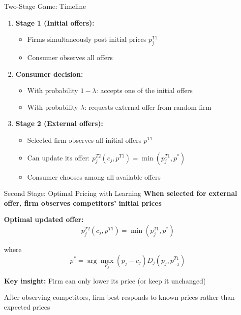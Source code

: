 \documentclass[10pt,aspectratio=169]{beamer}
\begin{document}

\begin{frame}{Two-Stage Game: Timeline}
\begin{enumerate}
    \item \textbf{Stage 1 (Initial offers):}
    \begin{itemize}
        \item Firms simultaneously post initial prices $p^{T1}_j$
        \item Consumer observes all offers
    \end{itemize}
    
    \vspace{0.3cm}
    
    \item \textbf{Consumer decision:}
    \begin{itemize}
        \item With probability $1-\lambda$: accepts one of the initial offers
        \item With probability $\lambda$: requests external offer from random firm
    \end{itemize}
    
    \vspace{0.3cm}
    
    \item \textbf{Stage 2 (External offers):}
    \begin{itemize}
        \item Selected firm observes all initial offers $p^{T1}$
        \item Can update its offer: $p^{T2}_j(c_j, p^{T1}) = \min(p^{T1}_j, p^*)$
        \item Consumer chooses among all available offers
    \end{itemize}
\end{enumerate}
\end{frame}


\begin{frame}{Second Stage: Optimal Pricing with Learning}
\textbf{When selected for external offer, firm observes competitors' initial prices}

\vspace{0.3cm}

\textbf{Optimal updated offer:}
$$p^{T2}_j(c_j, p^{T1}) = \min(p^{T1}_j, p^*)$$

where
$$p^* = \arg\max_{p_j} (p_j - c_j) D_j(p_j, p^{T1}_{-j})$$

\vspace{0.5cm}

\textbf{Key insight:} Firm can only lower its price (or keep it unchanged)

\vspace{0.3cm}
After observing competitors, firm best-responds to known prices rather than expected prices
\end{frame}
\end{document}

